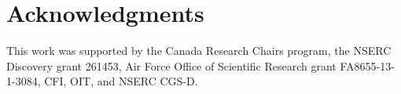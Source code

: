 \documentclass[10pt,letterpaper]{article}
\begin{document}
\section{Acknowledgments}
This work was supported by the Canada Research Chairs program,
the NSERC Discovery grant 261453, Air Force Office of Scientific Research grant FA8655-13-1-3084, CFI, OIT, and NSERC CGS-D\@.  %



\setlength{\bibleftmargin}{.125in}
\setlength{\bibindent}{-\bibleftmargin}


\end{document}
